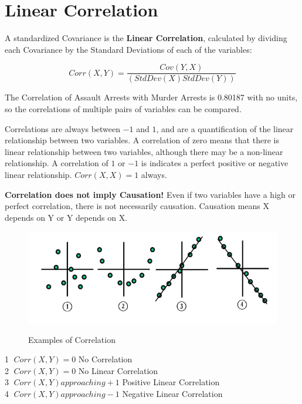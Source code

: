 \documentclass[nohyper,justified]{tufte-handout}\usepackage[]{graphicx}\usepackage[]{color}
\makeatletter
\def\maxwidth{ %
  \ifdim\Gin@nat@width>\linewidth
    \linewidth
  \else
    \Gin@nat@width
  \fi
}
\newenvironment{knitrout}{}{} %
\makeatother
\begin{document}
\newpage
\section{Linear Correlation}

A standardized Covariance is the \textbf{Linear Correlation}, calculated by dividing each Covariance by the Standard Deviations of each of the variables:

\begin{equation*}
Corr(X,Y)=\frac{Cov(Y,X)}{(StdDev(X)StdDev(Y))}
\end{equation*}

The Correlation of Assault Arrests with Murder Arrests is 0.80187 with no units, so the correlations of multiple pairs of variables can be compared.

Correlations are always between $-1$ and $1$, and are a quantification of the linear relationship between two variables. A correlation of zero means that there is linear relationship between two variables, although there may be a non-linear relationship. A correlation of $1$ or $-1$ is indicates a perfect positive or negative linear relationship. $Corr(X,X)=1$ always.

\textbf{Correlation does not imply Causation!} Even if two variables have a high or perfect correlation, there is not necessarily causation. Causation means X depends on Y or Y depends on X. 

\begin{knitrout}
\color{fgcolor}
\begin{figure}
{\centering \includegraphics[width=\maxwidth]{Correlation_types-Language-neutral.png} 
}
\caption[Correlation Types]{Examples of Correlation }\label{fig:correlationtypes}
\end{figure}
\textcircled{1} $Corr(X,Y)=0$ No Correlation \\
\textcircled{2} $Corr(X,Y)=0$ No Linear Correlation \\
\textcircled{3} $Corr(X,Y) approaching +1$ Positive Linear Correlation \\
\textcircled{4} $Corr(X,Y) approaching -1$ Negative Linear Correlation\\
\end{knitrout}
\end{document}
